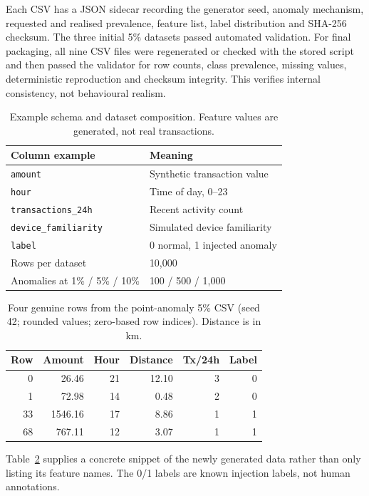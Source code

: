 \documentclass[11pt]{article}
\begin{document}
Each CSV has a JSON sidecar recording the generator seed, anomaly mechanism, requested and realised prevalence, feature list, label distribution and SHA-256 checksum. The three initial 5\% datasets passed automated validation. For final packaging, all nine CSV files were regenerated or checked with the stored script and then passed the validator for row counts, class prevalence, missing values, deterministic reproduction and checksum integrity. This verifies internal consistency, not behavioural realism.
 
\begin{table}[t]
\centering\small
\caption{Example schema and dataset composition. Feature values are generated, not real transactions.}
\label{tab:data}
\begin{tabular}{@{}ll@{}}
\toprule
Column example & Meaning \\
\midrule
\texttt{amount} & Synthetic transaction value \\
\texttt{hour} & Time of day, 0--23 \\
\texttt{transactions\_24h} & Recent activity count \\
\texttt{device\_familiarity} & Simulated device familiarity \\
\texttt{label} & 0 normal, 1 injected anomaly \\
\midrule
Rows per dataset & 10,000 \\
Anomalies at 1\% / 5\% / 10\% & 100 / 500 / 1,000 \\
\bottomrule
\end{tabular}
\end{table}

\begin{table}[t]
\centering\small
\caption{Four genuine rows from the point-anomaly 5\% CSV (seed 42; rounded values; zero-based row indices). Distance is in km.}
\label{tab:sample_rows}
\begin{tabular}{@{}rrrrrr@{}}
\toprule
Row & Amount & Hour & Distance & Tx/24h & Label \\
\midrule
0  & 26.46 & 21 & 12.10 & 3 & 0 \\
1  & 72.98 & 14 & 0.48 & 2 & 0 \\
33 & 1546.16 & 17 & 8.86 & 1 & 1 \\
68 & 767.11 & 12 & 3.07 & 1 & 1 \\
\bottomrule
\end{tabular}
\end{table}

Table~\ref{tab:sample_rows} supplies a concrete snippet of the newly generated data rather than only listing its feature names. The 0/1 labels are known injection labels, not human annotations.
\end{document}
